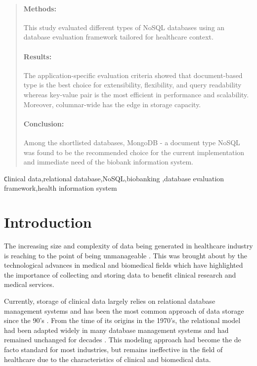 \documentclass[5p]{elsarticle}
\begin{document}
\begin{frontmatter}
\begin{abstract}
\paragraph{Methods:} This study evaluated different types of NoSQL databases using an database evaluation framework tailored for healthcare context.

\paragraph{Results:} The application-specific evaluation criteria showed that document-based type is the best choice for extensibility, flexibility, and query 
readability whereas key-value pair is the most efficient in performance and scalability. Moreover, columnar-wide has the edge in 
storage capacity. 

\paragraph{Conclusion:} Among the shortlisted databases, MongoDB - a document type NoSQL was found to be the recommended choice for the current implementation 
and immediate need of the biobank information system.

\end{abstract}

\begin{keyword}
\texttt Clinical data\sep relational database\sep NoSQL\sep biobanking
\sep database evaluation framework\sep health information system
\end{keyword}

\end{frontmatter}

\linenumbers

\section{Introduction}
The increasing size and complexity of data being generated in healthcare industry is reaching
 to the point of being unmanageable \cite{R.Kumar2015208,M.Ercan190510}. This was brought about 
 by the technological advances in medical and biomedical fields which have highlighted the importance 
 of collecting and storing data to benefit clinical research and medical services.

Currently, storage of clinical data largely relies on relational database management systems 
\cite{Z.Goli-Malekabadi201675,K.Lee201299} and has been the most common approach of data 
storage since the 90’s \cite{P.Atzeni1993}. From the time of its origins in the 1970’s, the relational 
model had been adapted widely in many database management systems \cite{K.Berg201329,D.Suciu200139} and 
had remained unchanged for decades \cite{M.Ercan190510}. This modeling approach had become the de 
facto standard for most industries, but remains ineffective in the field of healthcare due to the characteristics
of clinical and biomedical data.
\end{document}

